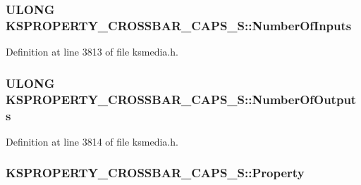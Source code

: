 \subsubsection[{\texorpdfstring{Number\+Of\+Inputs}{NumberOfInputs}}]{\setlength{\rightskip}{0pt plus 5cm}U\+L\+O\+NG K\+S\+P\+R\+O\+P\+E\+R\+T\+Y\+\_\+\+C\+R\+O\+S\+S\+B\+A\+R\+\_\+\+C\+A\+P\+S\+\_\+\+S\+::\+Number\+Of\+Inputs}\hypertarget{struct_k_s_p_r_o_p_e_r_t_y___c_r_o_s_s_b_a_r___c_a_p_s___s_a8e4073299ce90e4f0532809879bed645}{}\label{struct_k_s_p_r_o_p_e_r_t_y___c_r_o_s_s_b_a_r___c_a_p_s___s_a8e4073299ce90e4f0532809879bed645}


Definition at line 3813 of file ksmedia.\+h.

\subsubsection[{\texorpdfstring{Number\+Of\+Outputs}{NumberOfOutputs}}]{\setlength{\rightskip}{0pt plus 5cm}U\+L\+O\+NG K\+S\+P\+R\+O\+P\+E\+R\+T\+Y\+\_\+\+C\+R\+O\+S\+S\+B\+A\+R\+\_\+\+C\+A\+P\+S\+\_\+\+S\+::\+Number\+Of\+Outputs}\hypertarget{struct_k_s_p_r_o_p_e_r_t_y___c_r_o_s_s_b_a_r___c_a_p_s___s_af43acd2f781df3a67c6fabfa9e8b1e35}{}\label{struct_k_s_p_r_o_p_e_r_t_y___c_r_o_s_s_b_a_r___c_a_p_s___s_af43acd2f781df3a67c6fabfa9e8b1e35}


Definition at line 3814 of file ksmedia.\+h.

\subsubsection[{\texorpdfstring{Property}{Property}}]{ K\+S\+P\+R\+O\+P\+E\+R\+T\+Y\+\_\+\+C\+R\+O\+S\+S\+B\+A\+R\+\_\+\+C\+A\+P\+S\+\_\+\+S\+::\+Property}\hypertarget{struct_k_s_p_r_o_p_e_r_t_y___c_r_o_s_s_b_a_r___c_a_p_s___s_aafc90fdf4bf6efd5701a86bc31774fef}{}\label{struct_k_s_p_r_o_p_e_r_t_y___c_r_o_s_s_b_a_r___c_a_p_s___s_aafc90fdf4bf6efd5701a86bc31774fef}


